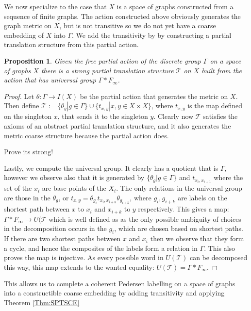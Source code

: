 \documentclass[11pt,a4paper]{amsart}
\theoremstyle{plain}
\newtheorem{proposition}[theorem]{Proposition}%
\theoremstyle{definition}%
\theoremstyle{remark}%
\begin{document}
We now specialize to the case that $X$ is a space of graphs constructed from a sequence of finite graphs. The action constructed above obviously generates the graph metric on $X$, but is not transitive so we do not yet have a coarse embedding of $X$ into $\Gamma$. We add the transitivity by by constructing a partial translation structure from this partial action.

\begin{proposition}\label{Prop:CheapTrick}
Given the free partial action of the discrete group $\Gamma$ on a space of graphs $X$ there is a strong partial translation structure $\mathcal{T}$ on $X$ built from the action that has universal group $\Gamma\ast F_{\infty}$.
\end{proposition}
\begin{proof}
Let $\theta: \Gamma \rightarrow I(X)$ be the partial action that generates the metric on $X$. Then define $\mathcal{T}:=\lbrace \theta_{g} | g \in \Gamma \rbrace \cup \lbrace t_{x,y} | x,y \in X\times X \rbrace$, where $t_{x,y}$ is the map defined on the singleton $x$, that sends it to the singleton $y$. Clearly now $\mathcal{T}$ satisfies the axioms of an abstract partial translation structure, and it also generates the metric coarse structure because the partial action does. 

Prove its strong!

Lastly, we compute the universal group. It clearly has a quotient that is $\Gamma$, however we observe also that it is generated by $\lbrace \theta_{g} | g \in \Gamma \rbrace$ and $t_{x_{i},x_{i+1}}$ where the set of the $x_{i}$ are base points of the $X_{i}$. The only relations in the universal group are those in the $\theta_{g}$, or $t_{x,y}=\theta_{g_{i}}t_{x_{i},x_{i+k}}\theta_{g_{i+k}}$, where $g_{i},g_{i+k}$ are labels on the shortest path between $x$ to $x_{i}$ and $x_{i+k}$ to $y$ respectively. This gives a map: $\Gamma \ast F_{\infty} \rightarrow U(\mathcal{T}$ which is well defined as as the only possible ambiguity of choices in the decomposition occurs in the $g_{i}$, which are chosen based on shortest paths. If there are two shortest paths between $x$ and $x_{i}$ then we observe that they form a cycle, and hence the composites of the labels form a relation in $\Gamma$. This also proves the map is  injective. As every possible word in $U(\mathcal{T})$ can be decomposed this way, this map extends to the wanted equality: $U(\mathcal{T})=\Gamma \ast F_{\infty}$.
\end{proof}

This allows us to complete a coherent Pedersen labelling on a space of graphs into a constructible coarse embedding by adding transitivity and applying Theorem \ref{Thm:SPTSCE}
\end{document}

